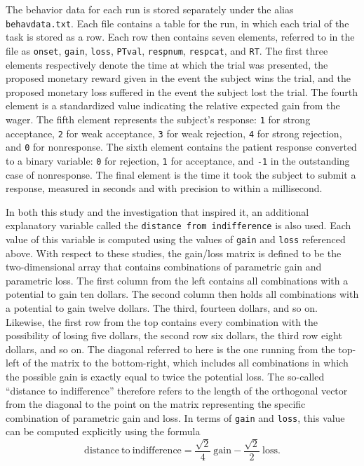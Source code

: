 \par \indent The behavior data for each run is stored separately under the alias
\texttt{behavdata.txt}. Each file contains a table for the run, in which each
trial of the task is stored as a row. Each row then contains seven elements,
referred to in the file as \texttt{onset}, \texttt{gain}, \texttt{loss},
\texttt{PTval}, \texttt{respnum}, \texttt{respcat}, and \texttt{RT}. The first
three elements respectively denote the time at which the trial was presented,
the proposed monetary reward given in the event the subject wins the trial, and
the proposed monetary loss suffered in the event the subject lost the trial. The
fourth element is a standardized value indicating the relative expected gain
from the wager. The fifth element represents the subject's response: \texttt{1}
for strong acceptance, \texttt{2} for weak acceptance, \texttt{3} for weak
rejection, \texttt{4} for strong rejection, and \texttt{0} for nonresponse. The
sixth element contains the patient response converted to a binary variable:
\texttt{0} for rejection, \texttt{1} for acceptance, and \texttt{-1} in the
outstanding case of nonresponse. The final element is the time it took the
subject to submit a response, measured in seconds and with precision to within a
millisecond.

\par \indent In both this study and the investigation that inspired it, an
additional explanatory variable called the \texttt{distance from indifference}
is also used. Each value of this variable is computed using the values of
\texttt{gain} and \texttt{loss} referenced above. With respect to these studies,
the gain/loss matrix is defined to be the two-dimensional array that contains
combinations of parametric gain and parametric loss. The first column from the
left contains all combinations with a potential to gain ten dollars. The second
column then holds all combinations with a potential to gain twelve dollars. The
third, fourteen dollars, and so on. Likewise, the first row from the top
contains every combination with the possibility of losing five dollars, the
second row six dollars, the third row eight dollars, and so on. The diagonal
referred to here is the one running from the top-left of the matrix to the
bottom-right, which includes all combinations in which the possible gain is
exactly equal to twice the potential loss. The so-called ``distance to
indifference'' therefore refers to the length of the orthogonal vector from the
diagonal to the point on the matrix representing the specific combination of
parametric gain and loss. In terms of \texttt{gain} and \texttt{loss}, this
value can be computed explicitly using the formula
\[
\mathrm{distance \ to \ indifference} = \frac{\sqrt{2}}{4} \ \mathrm{gain} -
\frac{\sqrt{2}}{2} \ \mathrm{loss}.
\]

